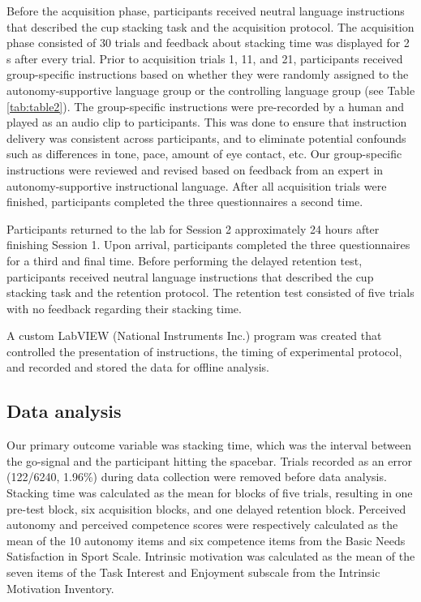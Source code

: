 \documentclass[man,floatsintext,donotrepeattitle,letterpaper,12pt]{apa7}
\begin{document}
Before the acquisition phase, participants received neutral language instructions that described the cup stacking task and the acquisition protocol. The acquisition phase consisted of 30 trials and feedback about stacking time was displayed for 2 s after every trial. Prior to acquisition trials 1, 11, and 21, participants received group-specific instructions based on whether they were randomly assigned to the autonomy-supportive language group or the controlling language group (see Table \ref{tab:table2}). The group-specific instructions were pre-recorded by a human and played as an audio clip to participants. This was done to ensure that instruction delivery was consistent across participants, and to eliminate potential confounds such as differences in tone, pace, amount of eye contact, etc. Our group-specific instructions were reviewed and revised based on feedback from an expert in autonomy-supportive instructional language.\footnotemark{} After all acquisition trials were finished, participants completed the three questionnaires a second time.

Participants returned to the lab for Session 2 approximately 24 hours after finishing Session 1. Upon arrival, participants completed the three questionnaires for a third and final time. Before performing the delayed retention test, participants received neutral language instructions that described the cup stacking task and the retention protocol. The retention test consisted of five trials with no feedback regarding their stacking time.

A custom LabVIEW (National Instruments Inc.) program was created that controlled the presentation of instructions, the timing of experimental protocol, and recorded and stored the data for offline analysis.

\subsection{Data analysis}

Our primary outcome variable was stacking time, which was the interval between the go-signal and the participant hitting the spacebar. Trials recorded as an error (122/6240, 1.96\%) during data collection were removed before data analysis. Stacking time was calculated as the mean for blocks of five trials, resulting in one pre-test block, six acquisition blocks, and one delayed retention block. Perceived autonomy and perceived competence scores were respectively calculated as the mean of the 10 autonomy items and six competence items from the Basic Needs Satisfaction in Sport Scale. Intrinsic motivation was calculated as the mean of the seven items of the Task Interest and Enjoyment subscale from the Intrinsic Motivation Inventory.
\end{document}
